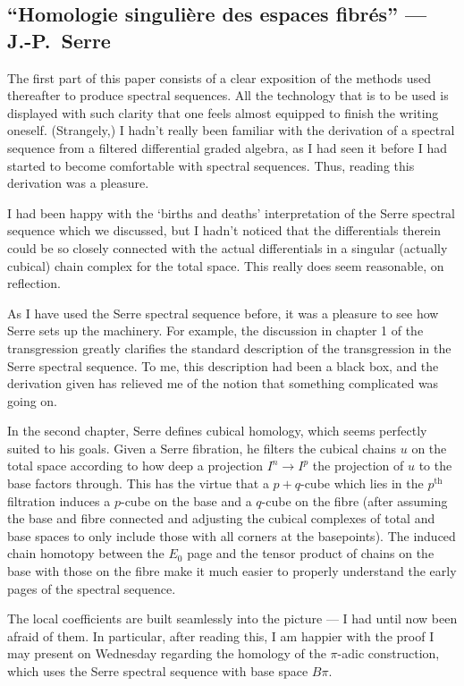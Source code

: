 \documentclass[11pt]{article}
\newcommand{\KanSemResponse}[1]
{
\thispagestyle{fancy}
\section{#1}
}
\begin{document}
\tableofcontents

\pagebreak

\begin{SerreHomSingFibSpace}
\KanSemResponse
{``Homologie singuli\`ere des espaces fibr\'es'' --- J.-P.\ Serre}
The first part of this paper consists of a clear exposition of the methods used thereafter to produce spectral sequences. All the technology that is to be used is displayed with such clarity that one feels almost equipped to finish the writing oneself. (Strangely,) I hadn't really been familiar with the derivation of a spectral sequence from a filtered differential graded algebra, as I had seen it before I had started to become comfortable with spectral sequences. Thus, reading this derivation was a pleasure.

I had been happy with the `births and deaths' interpretation of the Serre spectral sequence which we discussed, but I hadn't noticed that the differentials therein could be so closely connected with the actual differentials in a singular (actually cubical) chain complex for the total space. This really does seem reasonable, on reflection.

As I have used the Serre spectral sequence before, it was a pleasure to see how Serre sets up the machinery. For example, the discussion in chapter 1 of the transgression greatly clarifies the standard description of the transgression in the Serre spectral sequence. To me, this description had been a black box, and the derivation given has relieved me of the notion that something complicated was going on.

In the second chapter, Serre defines cubical homology, which seems perfectly suited to his goals. Given a Serre fibration, he filters the cubical chains $u$ on the total space according to how deep a projection $I^n\to I^p$ the projection of $u$ to the base factors through. This has the virtue that a $p+q$-cube which lies in the $p^\text{th}$ filtration induces a $p$-cube on the base and a $q$-cube on the fibre (after assuming the base and fibre connected and adjusting the cubical complexes of total and base spaces to only include those with all corners at the basepoints). The induced chain homotopy between the $E_0$ page and the tensor product of chains on the base with those on the fibre make it much easier to properly understand the early pages of the spectral sequence.

The local coefficients are built seamlessly into the picture --- I had until now been afraid of them. In particular, after reading this, I am happier with the proof I may present on Wednesday regarding the homology of the $\pi$-adic construction, which uses the Serre spectral sequence with base space $B\pi$.


\end{SerreHomSingFibSpace}
\end{document}
